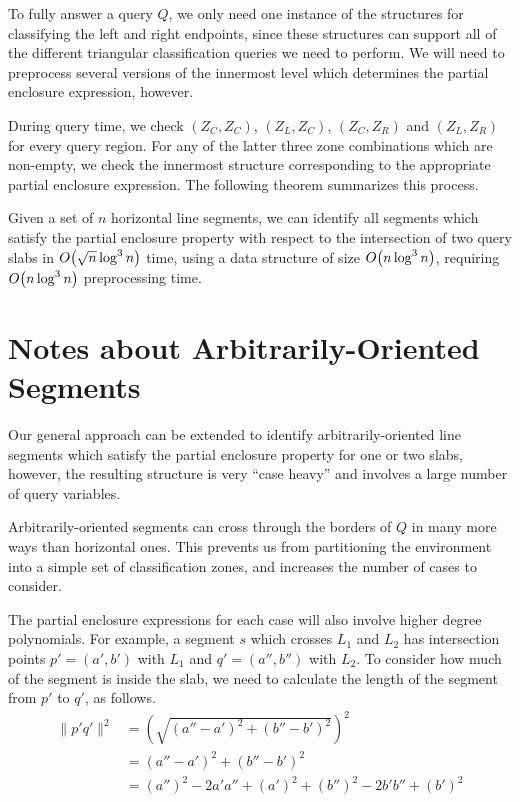 To fully answer a query $Q$, we only need one instance of the structures for classifying the left and right endpoints, since these structures can support all of the different triangular classification queries we need to perform.
We will need to preprocess several versions of the innermost level which determines the partial enclosure expression, however.

During query time, we check $(Z_C, Z_C)$, $(Z_L, Z_C)$, $(Z_C, Z_R)$ and $(Z_L, Z_R)$ for every query region. 
For any of the latter three zone combinations which are non-empty, we check the innermost structure corresponding to the appropriate partial enclosure expression.
The following theorem summarizes this process.

\begin{theorem}
\label{th:slabs:two}
Given a set of $n$ horizontal line segments, we can identify all segments which satisfy the partial enclosure property with respect to the intersection of two query slabs in $O\!\left(\sqrt{n}\log^3{n}\right)$ time, using a data structure of size $O\!\left(n\log^3{n}\right)$, requiring $O\!\left(n\log^3{n}\right)$ preprocessing time.
\end{theorem}


\section{Notes about Arbitrarily-Oriented Segments}
\label{:slabs:remarks}

Our general approach can be extended to identify arbitrarily-oriented line segments which satisfy the partial enclosure property for one or two slabs, however, the resulting structure is very ``case heavy'' and involves a large number of query variables.

Arbitrarily-oriented segments can cross through the borders of $Q$ in many more ways than horizontal ones.
This prevents us from partitioning the environment into a simple set of classification zones, and increases the number of cases to consider.

The partial enclosure expressions for each case will also involve higher degree polynomials.
For example, a segment $s$ which crosses $L_1$ and $L_2$ has intersection points $p' = (a', b')$ with $L_1$ and $q' = (a'', b'')$ with $L_2$.  
To consider how much of the segment is inside the slab, we need to calculate the length of the segment from $p'$ to $q'$, as follows.
\[
\begin{split}
\|p'q'\|^2 
&= \left( \sqrt{(a'' - a')^2 + (b'' - b')^2} \right)^2 \\
%
&= (a'' - a')^2 + (b'' - b')^2 \\
%
&= (a'')^2 - 2a'a'' + (a')^2 + (b'')^2 - 2b'b'' + (b')^2
\end{split}
\]


